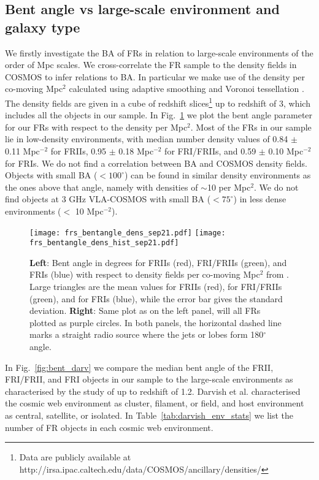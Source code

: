 \documentclass[galaxies,article,submit,moreauthors,pdftex]{Definitions/mdpi}
\begin{document}
\subsection{Bent angle vs large-scale environment and galaxy type}

We firstly investigate the BA of FRs in relation to large-scale environments of the order of Mpc scales. We cross-correlate the FR sample to the density fields in COSMOS \citep{scoville13} to infer relations to BA. In particular we make use of the density per co-moving Mpc$^{2}$ calculated using adaptive smoothing and Voronoi tessellation \cite{scoville13}. The density fields are given in a cube of redshift slices\footnote{Data are publicly available at http://irsa.ipac.caltech.edu/data/COSMOS/ancillary/densities/} up to redshift of 3, which includes all the objects in our sample. In Fig.~\ref{fig:bent_dens} we plot the bent angle parameter for our FRs with respect to the density per Mpc$^{2}$. Most of the FRs in our sample lie in low-density environments, with median number density values of 0.84 $\pm$ 0.11 Mpc$^{-2}$ for FRIIs, 0.95 $\pm$ 0.18 Mpc$^{-2}$ for FRI/FRIIs, and 0.59 $\pm$ 0.10 Mpc$^{-2}$ for FRIs. We do not find a correlation between BA and COSMOS density fields. Objects with small BA ($<100^{\circ}$) can be found in similar density environments as the ones above that angle, namely with densities of $\sim$10 per Mpc$^{2}$. We do not find objects at 3 GHz VLA-COSMOS with small BA ($<75^{\circ}$) in less dense environments ($<$ 10 Mpc$^{-2}$). 



  \begin{figure}[!ht]
  \resizebox{\hsize}{!}
 {\texttt{[image: frs\_bentangle\_dens\_sep21.pdf]}
\texttt{[image: frs\_bentangle\_dens\_hist\_sep21.pdf]}
            }
                 
       \caption{{\bf Left}: Bent angle in degrees for FRIIs (red), FRI/FRIIs (green), and FRIs (blue) with respect to density fields per co-moving Mpc$^{2}$ from \cite{scoville13}. Large triangles are the mean values for FRIIs (red), for FRI/FRIIs (green), and for FRIs (blue), while the error bar gives the standard deviation. 
       {\bf Right}: Same plot as on the left panel, will all FRs plotted as purple circles. In both panels, the horizontal dashed line marks a straight radio source where the jets or lobes form 180$^{\circ}$ angle.
   }
              \label{fig:bent_dens}%
    \end{figure}


In Fig.~\ref{fig:bent_darv} we compare the median bent angle of the FRII, FRI/FRII, and FRI objects in our sample to the large-scale environments as characterised by the study of \citep{darvish17} up to redshift of 1.2. Darvish et al. \citep{darvish17} characterised the cosmic web environment as cluster, filament, or field, and host environment as central, satellite, or isolated. In Table~\ref{tab:darvish_env_stats} we list the number of FR objects in each cosmic web environment.
\end{document}
